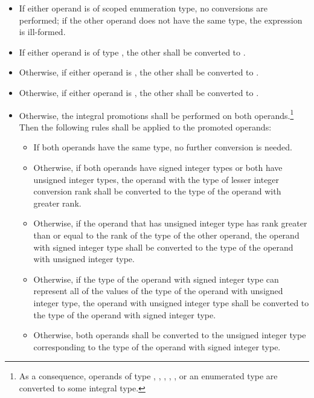 \begin{itemize}
\item If either operand is of scoped enumeration type, no conversions
are performed; if the other operand does not have the same type, the expression is
ill-formed.

\item If either operand is of type , the
other shall be converted to .

\item Otherwise, if either operand is , the other shall be
converted to .

\item Otherwise, if either operand is , the other shall be
converted to .

\item Otherwise, the integral promotions shall be
performed on both operands.\footnote{As a consequence, operands of type , , ,
, , or an enumerated type are converted
to some integral type.}
Then the following rules shall be applied to the promoted operands:

\begin{itemize}

\item If both operands have the same type, no further conversion is
needed.

\item Otherwise, if both operands have signed integer types or both have
unsigned integer types, the operand with the type of lesser integer
conversion rank shall be converted to the type of the operand with
greater rank.

\item Otherwise, if the operand that has unsigned integer type has rank
greater than or equal to the rank of the type of the other operand, the
operand with signed integer type shall be converted to the type of the
operand with unsigned integer type.

\item Otherwise, if the type of the operand with signed integer type can
represent all of the values of the type of the operand with unsigned
integer type, the operand with unsigned integer type shall be converted
to the type of the operand with signed integer type.

\item Otherwise, both operands shall be converted to the unsigned
integer type corresponding to the type of the operand with signed
integer type.
\end{itemize}
\end{itemize}

